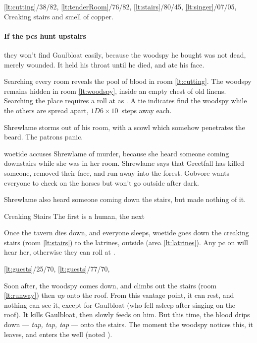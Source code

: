 \documentclass[10pt,twoside]{book}
\begin{document}
%
  {%
    \ref{lt:cutting}/38/82,
    \ref{lt:tenderRoom}/76/82,
    \ref{lt:stairs}/80/45,
    \ref{lt:singer}/07/05,
  }%
  {Creaking stairs and smell of copper.
  }

\paragraph{If the \glspl{pc} hunt upstairs}
they won't find Gaulbloat easily, because the \gls{woodspy} he bought was not dead, merely wounded.
It held his throat until he died, and ate his face.

Searching every room reveals the pool of blood in room \vref{lt:cutting}.
The \gls{woodspy} remains hidden in room \vref{lt:woodspy}, inside an empty chest of old linens.
Searching the place requires a  roll at \tn[12] as .
A tie indicates  find the \gls{woodspy} while the others are spread apart, $1D6 \times 10$~\glspl{step} away each.

Shrewlame storms out of his room, with a scowl which somehow penetrates the beard.
The patrons panic.

\Gls{woetide} accuses Shrewlame of murder, because she heard someone coming downstairs while she was in her room.
Shrewlame says that Greetfall has killed someone, removed their face, and run away into the forest.
Gobvore wants everyone to check on the horses but won't go outside after dark.

Shrewlame also heard someone coming down the stairs, but made nothing of it.

{Creaking Stairs}%
{The first is a human, the next }%

Once the tavern dies down, and everyone sleeps, \gls{woetide} goes down the creaking stairs (room \ref{lt:stairs}) to the latrines, outside (area \ref{lt:latrines}).
Any \gls{pc} on  will hear her, otherwise they can roll  at \tn[12].

%
  {%
    \ref{lt:guests}/25/70,
    \ref{lt:guests}/77/70,
  }%
  {}

Soon after, the \gls{woodspy} comes down, and climbs out the stairs (room \ref{lt:runway}) then \emph{up} onto the roof.
From this vantage point, it can rest, and nothing can see it, except for Gaulbloat (who fell asleep after singing on the roof).
It kills Gaulbloat, then slowly feeds on him.
But this time, the blood drips down --- \textit{tap, tap, tap} --- onto the stairs.
The moment the \gls{woodspy} notices this, it leaves, and enters the well (noted ).
\end{document}
